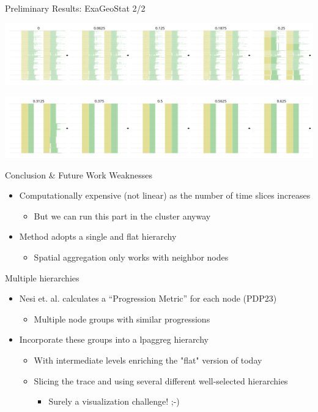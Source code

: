 \documentclass[12pt,xcolor=dvipsnames,presentation,aspectratio=169]{beamer}
\begin{document}
{\begin{frame}[label={sec:org15cf370}]{Preliminary Results: ExaGeoStat 2/2}
\begin{center}
\includegraphics[width=\linewidth]{./exageo_5p_line1.png}
\end{center}

\begin{center}
\includegraphics[width=\linewidth]{./exageo_5p_line2.png}
\end{center}
\end{frame}
\begin{frame}[label={sec:orgb44903f}]{Conclusion \& Future Work}
Weaknesses
\begin{itemize}
\item Computationally expensive (not linear) as the number of time slices increases
\begin{itemize}
\item But we can run this part in the cluster anyway
\end{itemize}
\item Method adopts a single and flat hierarchy
\begin{itemize}
\item Spatial aggregation only works with neighbor nodes
\end{itemize}
\end{itemize}

\vfill\pause

Multiple hierarchies
\begin{itemize}
\item Nesi et. al. calculates a ``Progression Metric'' for each node (PDP23)
\begin{itemize}
\item Multiple node groups with similar progressions
\end{itemize}
\item Incorporate these groups into a lpaggreg hierarchy
\begin{itemize}
\item With intermediate levels enriching the "flat" version of today
\item Slicing the trace and using several different well-selected hierarchies
\begin{itemize}
\item Surely a visualization challenge! ;-)
\end{itemize}
\end{itemize}
\end{itemize}


\end{frame}}
\end{document}
